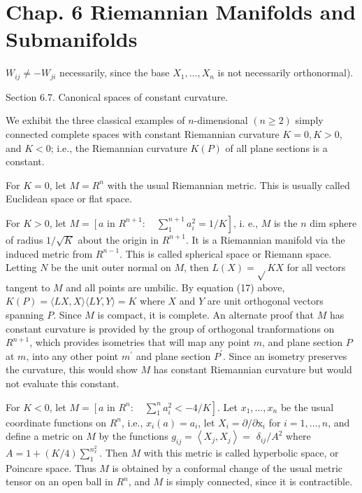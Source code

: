 \documentclass[10pt]{article}
\begin{document}
\section{Chap. 6 Riemannian Manifolds and Submanifolds}
$W_{i j} \neq-W_{j i}$ necessarily, since the base $X_{1}, \ldots, X_{n}$ is not necessarily orthonormal).

Section 6.7. Canonical spaces of constant curvature.

We exhibit the three classical examples of $n$-dimensional $(n \geq 2)$ simply connected complete spaces with constant Riemannian curvature $K=0, K>0$, and $K<0$; i.e., the Riemannian curvature $K(P)$ of all plane sections is a constant.

For $K=0$, let $M=R^{n}$ with the usual Riemannian metric. This is usually called Euclidean space or flat space.

For $K>0$, let $M=\left[a\right.$ in $\left.R^{n+1}: \quad \sum_{1}^{n+1} a_{i}^{2}=1 / K\right]$, i. e., $M$ is the $n$ dim sphere of radius $1 / \sqrt{K}$ about the origin in $R^{n+1}$. It is a Riemannian manifold via the induced metric from $R^{n-1}$. This is called spherical space or Riemann space. Letting $N$ be the unit outer normal on $M$, then $L(X)=\sqrt{ } K X$ for all vectors tangent to $M$ and all points are umbilic. By equation (17) above, $K(P)=\langle L X, X\rangle\langle L Y, Y\rangle=K$ where $X$ and $Y$ are unit orthogonal vectors spanning $P$. Since $M$ is compact, it is complete. An alternate proof that $M$ has constant curvature is provided by the group of orthogonal tranformations on $R^{n+1}$, which provides isometries that will map any point $m$, and plane section $P$ at $m$, into any other point $m^{\prime}$ and plane section $P^{\prime}$. Since an isometry preserves the curvature, this would show $M$ has constant Riemannian curvature but would not evaluate this constant.

For $K<0$, let $M=\left[a\right.$ in $\left.R^{n}: \quad \sum_{1}^{n} a_{i}^{2}<-4 / K\right]$. Let $x_{1}, \ldots, x_{n}$ be the usual coordinate functions on $R^{n}$, i.e., $x_{i}(a)=a_{i}$, let $X_{i}=\partial / \partial \mathrm{x}_{i}$ for $i=1, \ldots, n$, and define a metric on $M$ by the functions $g_{i j}=\left\langle X_{j}, X_{j}\right\rangle=$ $\delta_{i j} / A^{2}$ where $A=1+(K / 4) \sum_{1}^{n_{x}^{2}}$. Then $M$ with this metric is called hyperbolic space, or Poincare space. Thus $M$ is obtained by a conformal change of the usual metric tensor on an open ball in $R^{n}$, and $M$ is simply connected, since it is contractible.
\end{document}
